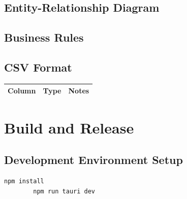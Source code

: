 \documentclass[12pt, a4paper]{report}
\begin{document}
	
	\section{Entity-Relationship Diagram}
	
	\section{Business Rules}
	
	\section{CSV Format}
	
	\begin{tabularx}{\textwidth}{l l X}
		\toprule
		\textbf{Column} & \textbf{Type} & \textbf{Notes} \\
		\midrule
		\bottomrule
	\end{tabularx}
	
	\chapter{Build and Release}
	
	\section{Development Environment Setup}
	
	\begin{lstlisting}[language=bash, caption={Install dependencies and start dev server}]
		npm install
		npm run tauri dev
	\end{lstlisting}
	
\end{document}
